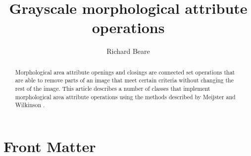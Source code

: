 \documentclass{InsightArticle}
\title{Grayscale morphological attribute operations}
\author{Richard Beare}
\begin{document}
\maketitle

\ifhtml
\chapter*{Front Matter\label{front}}
\fi


\begin{abstract}
\noindent
Morphological area attribute openings and closings\cite{Cheng92,Vincent93a} are connected set
operations that are able to remove parts of an image that meet certain
criteria without changing the rest of the image. This article describes a number of
classes that implement morphological area attribute operations using
the methods described by Meijster and Wilkinson \cite{meijster02}.
\end{abstract}

\tableofcontents






\end{document}
